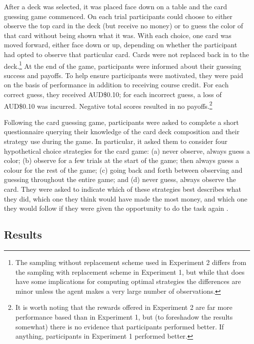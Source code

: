 \documentclass[authoryear]{elsarticle}
\newcommand{\subsectionX}[1]{\subsection{#1}}
\begin{document}
After a deck was selected, it was placed face down on a table and the card guessing game commenced. On each trial  participants could choose to either observe the top card in the deck (but receive no money) or to guess the color of that card without being shown what it was. With each choice, one card was moved forward, either face down or up, depending on whether the participant had opted to observe that particular card. Cards were not replaced back in to the deck.\footnote{The sampling without replacement scheme used in Experiment 2 differs from the sampling with replacement scheme in Experiment 1, but while that does have some implications for computing optimal strategies the differences are minor unless the agent makes a very large number of observations.} At the end of the game, participants were informed about their guessing success and payoffs. To help ensure participants were motivated, they were paid on the basis of performance in addition to receiving course credit. For each correct guess, they received AUD\$0.10; for each incorrect guess, a loss of AUD\$0.10 was incurred. Negative total scores resulted in no payoffs.\footnote{It is worth noting that the rewards offered in Experiment 2 are far more performance based than in Experiment 1, but (to foreshadow the results somewhat) there is no evidence that participants performed better. If anything, participants in Experiment 1 performed better.}

Following the card guessing game, participants were asked to complete a short questionnaire querying their knowledge of the card deck composition and their strategy use during the game. In particular, it asked them to consider four hypothetical choice strategies for the card game: (a) never observe, always guess a color; (b) observe for a few trials at the start of the game; then always guess a colour for the rest of the game; (c) going back and forth between observing and guessing throughout the entire game; and (d) never guess, always observe the card. They were asked to indicate which of these strategies best describes what they did, which one they think would have made the most money, and which one they would follow if they were given the opportunity to do the task again \citep[cf.][]{koehler_probability_2010}.

\subsectionX{Results}
\end{document}
